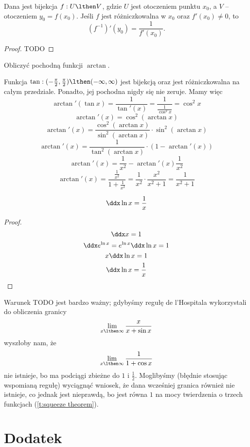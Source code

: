 \documentclass[11pt]{scrartcl}
\begin{document}
    \begin{theorem}
        Dana jest bijekcja $f: U \lthen V$, gdzie $U$ jest otoczeniem punktu $x_0$, a $V$ -- otoczeniem $y_0 = f(x_0)$. Jeśli $f$ jest różniczkowalna w $x_0$ oraz $f'(x_0) \neq 0$, to
        \[ \left(f^{-1}\right)'(y_0) = \frac{1}{f'(x_0)}. \]
    \end{theorem}
    \begin{proof}
        TODO
    \end{proof}

    \begin{example}
        Obliczyć pochodną funkcji $\arctan$.
    \end{example}
    \begin{solution}
        Funkcja $\tan : (-\frac{\pi}{2}, \frac{\pi}{2}) \lthen (-\infty, \infty)$ jest bijekcją oraz jest różniczkowalna na całym przedziale. Ponadto, jej pochodna nigdy się nie zeruje. Mamy więc
        \[ \arctan'(\tan x) = \frac{1}{\tan'(x)} = \frac{1}{\frac{1}{\cos^2 x}} = \cos^2 x \]
        \[ \arctan'(x) = \cos^2(\arctan x) \]
        \[ \arctan'(x) = \frac{\cos^2(\arctan x)}{\sin^2(\arctan x)} \cdot \sin^2(\arctan x) \]
        \[ \arctan'(x) = \frac{1}{\tan^2(\arctan x)} \cdot (1 - \arctan'(x)) \]
        \[ \arctan'(x) = \frac{1}{x^2} - \arctan'(x)\frac{1}{x^2} \]
        \[ \arctan'(x) = \frac{\frac{1}{x^2}}{1 + \frac{1}{x^2}} = \frac{1}{x^2}\cdot\frac{x^2}{x^2 + 1} = \frac{1}{x^2 + 1} \]
    \end{solution}

    \begin{theorem}
        \[ \ddx \ln x = \frac{1}{x} \]
    \end{theorem}
    \begin{proof}
        \begin{gather*}
            \ddx x = 1 \\
            \ddx e^{\ln x} = e^{\ln x} \ddx \ln x = 1 \\
            x \ddx \ln x = 1 \\
            \ddx \ln x = \frac{1}{x}
        \end{gather*}
    \end{proof}

    \begin{theorem}
        
    \end{theorem}
    \begin{remark}
        Warunek TODO jest bardzo ważny; gdybyśmy regułę de l'Hospitala wykorzystali do obliczenia granicy
        \[ \lim_{x\lthen\infty}\frac{x}{x + \sin x} \]
        wyszłoby nam, że
        \[ \lim_{x\lthen\infty}\frac{1}{1 + \cos x} \]
        nie istnieje, bo ma podciągi zbieżne do $1$ i $\frac{1}{2}$. Moglibyśmy (błędnie stosując wspomianą regułę) wyciągnąć wniosek, że dana wcześniej granica również nie istnieje, co jednak jest nieprawdą, bo jest równa $1$ na mocy twierdzenia o trzech funkcjach (\ref{t:squeeze theorem}).
    \end{remark}

    \appendix
    \section{Dodatek}
    
\end{document}
